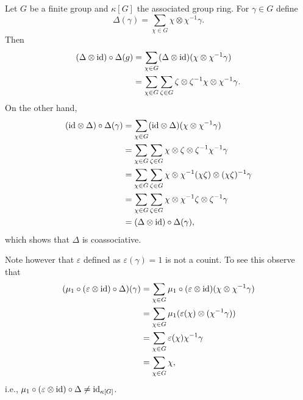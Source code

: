 \begin{xmpl}
    Let $G$ be a finite group and $\kappa[G]$ the associated group ring. For $\gamma\in G$ define
    $$
        \Delta(\gamma) = \sum_{\chi\in G}\chi\otimes\chi^{-1}\gamma.
    $$
    Then
    \begin{align*}
        (\Delta\otimes\text{\rm id})\circ\Delta(g)
            &= \sum_{\chi\in G}
                (\Delta\otimes\text{\rm id})(\chi\otimes\chi^{-1}\gamma)\\
            &= \sum_{\chi\in G}\sum_{\zeta\in G}
                \zeta\otimes\zeta^{-1}\chi\otimes\chi^{-1}\gamma.
    \end{align*}
    On the other hand,
    \begin{align*}
        (\text{\rm id}\otimes\Delta)\circ\Delta(\gamma)
            &= \sum_{\chi\in G}
                (\text{\rm id}\otimes\Delta)(\chi\otimes\chi^{-1}\gamma)\\
            &= \sum_{\chi\in G}\sum_{\zeta\in G}
                \chi\otimes\zeta\otimes\zeta^{-1}\chi^{-1}\gamma\\
            &= \sum_{\chi\in G}\sum_{\zeta\in G}
                \chi\otimes\chi^{-1}(\chi\zeta)
                    \otimes(\chi\zeta)^{-1}\gamma\\
            &= \sum_{\chi\in G}\sum_{\zeta\in G}
                \chi\otimes\chi^{-1}\zeta
                    \otimes\zeta^{-1}\gamma\\
            &= (\Delta\otimes\text{\rm id})\circ\Delta(\gamma),
    \end{align*}
    which shows that $\Delta$ is coassociative.

    Note however that $\varepsilon$ defined as $\varepsilon(\gamma)=1$ is not a couint. To see this observe that
    \begin{align*}
        (\mu_1\circ(\varepsilon\otimes\text{\rm id})\circ\Delta)(\gamma)
            &= \sum_{\chi\in G}
                \mu_1\circ(\varepsilon\otimes\text{\rm id})
                    (\chi\otimes\chi^{-1}\gamma)\\
            &= \sum_{\chi\in G}
                \mu_1(\varepsilon(\chi)\otimes(\chi^{-1}\gamma))\\
            &= \sum_{\chi\in G}\varepsilon(\chi)\chi^{-1}\gamma\\
            &= \sum_{\chi\in G}\chi,
    \end{align*}
    i.e., $\mu_1\circ(\varepsilon\otimes\text{\rm id})\circ\Delta\ne\text{\rm id}_{\kappa[G]}$.
\end{xmpl}

